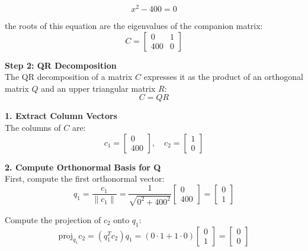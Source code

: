 \documentclass[journal]{IEEEtran}
\begin{document}
\begin{equation}
    x^2 - 400 = 0
\end{equation}

the roots of this equation are the eigenvalues of the companion matrix:
\begin{equation}
    C = \begin{bmatrix} 0 & 1 \\ 400 & 0 \end{bmatrix}
\end{equation}

\textbf{Step 2: QR Decomposition} \\
The QR decomposition of a matrix $C$ expresses it as the product of an orthogonal matrix $Q$ and an upper triangular matrix $R$:
\begin{equation}
    C = QR
\end{equation}

\textbf{1. Extract Column Vectors} \\
The columns of $C$ are:
\begin{equation}
    c_1 = \begin{bmatrix} 0 \\ 400 \end{bmatrix}, \quad c_2 = \begin{bmatrix} 1 \\ 0 \end{bmatrix}
\end{equation}

\textbf{2. Compute Orthonormal Basis for Q} \\
First, compute the first orthonormal vector:
\begin{equation}
    q_1 = \frac{c_1}{\|c_1\|} = \frac{1}{\sqrt{0^2 + 400^2}} \begin{bmatrix} 0 \\ 400 \end{bmatrix} = \begin{bmatrix} 0 \\ 1 \end{bmatrix}
\end{equation}

Compute the projection of $c_2$ onto $q_1$:
\begin{equation}
    \text{proj}_{q_1} c_2 = (q_1^T c_2) q_1 = (0 \cdot 1 + 1 \cdot 0) \begin{bmatrix} 0 \\ 1 \end{bmatrix} = \begin{bmatrix} 0 \\ 0 \end{bmatrix}
\end{equation}
\end{document}
